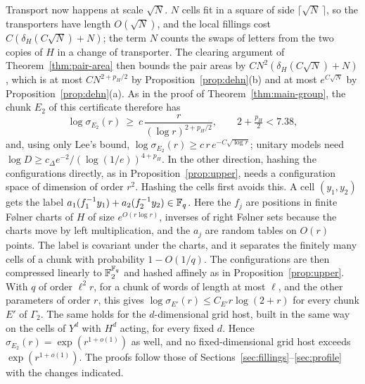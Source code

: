 \begin{remark}
Transport now happens at scale $\sqrt N$. $N$ cells fit in a square of side $\lceil\sqrt N\,\rceil$, so the transporters have length $O(\sqrt N)$,
and the local fillings cost $C(\delta_H(C\sqrt N)+N)$; the term $N$ counts the swaps of letters from the two copies of $H$ in a change of
transporter. The clearing argument of Theorem~\ref{thm:pair-area} then bounds the pair areas by $CN^2(\delta_H(C\sqrt N)+N)$, which is at most
$CN^{2+p_H/2}$ by Proposition~\ref{prop:dehn}(b) and at most $e^{C\sqrt N}$ by Proposition~\ref{prop:dehn}(a). As in the proof of
Theorem~\ref{thm:main-group}, the chunk $E_2$ of this certificate therefore has
\[
\log\sigma_{E_2}(r)\ \ge\ c\,\frac{r}{(\log r)^{2+p_H/2}},\qquad 2+\tfrac{p_H}2<7.38,
\]
and, using only Lee's bound, $\log\sigma_{E_2}(r)\ge c\,r\,e^{-C\sqrt{\log r}}$; unitary models need $\log D\ge c_\Delta e^{-2}/(\log(1/e))^{4+p_H}$.
In the other direction, hashing the configurations directly, as in Proposition~\ref{prop:upper}, needs a configuration space of dimension of
order $r^2$. Hashing the cells first avoids this. A cell $(y_1,y_2)$ gets the label $a_1(f_1^{-1}y_1)+a_2(f_2^{-1}y_2)\in\mathbb F_q$. Here the $f_j$ are
positions in finite F{\o}lner charts of $H$ of size $e^{O(r\log r)}$, inverses of right F{\o}lner sets because the charts move by left
multiplication, and the $a_j$ are random tables on $O(r)$ points. The label is covariant under the charts, and it separates the finitely many
cells of a chunk with probability $1-O(1/q)$. The configurations are then compressed linearly to $\mathbb F_2^{\mathbb F_q}$ and hashed affinely as in
Proposition~\ref{prop:upper}. With $q$ of order $\ell^2r$, for a chunk of words of length at most $\ell$, and the other parameters of order $r$,
this gives $\log\sigma_{E'}(r)\le C_{E'}r\log(2+r)$ for every chunk $E'$ of $\Gamma_2$. The same holds for the $d$-dimensional grid host, built
in the same way on the cells of $Y^d$ with $H^d$ acting, for every fixed $d$. Hence $\sigma_{E_2}(r)=\exp(r^{1+o(1)})$ as well, and no
fixed-dimensional grid host exceeds $\exp(r^{1+o(1)})$. The proofs follow those of Sections~\ref{sec:fillings}--\ref{sec:profile} with the
changes indicated.
\end{remark}


